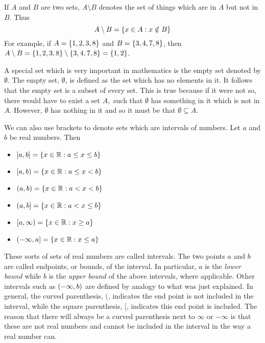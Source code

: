 If $A$ and $B$ are two sets, $A\setminus B$\index{$\setminus$} denotes the set of things which
are in $A$ but not in $B.$ Thus
\begin{equation*}
A\setminus B =  \left\{x\in A:x\notin B\right\} 
\end{equation*}
For example, if $A = \left\{1,2,3,8 \right\}$ and $B = \left\{3,4,7,8 \right\}$, then $A \setminus B = \left\{1,2,3,8\right\} \setminus 
\left\{3,4,7,8 \right\} =\left\{1,2 \right\}$.

A special set which is very important in mathematics is the empty set denoted by $\emptyset .$ The empty set, $\emptyset $, is
defined as the set which has no elements in it. It follows that the empty set is a subset of every set. 
This is true because if it were not so, there would have to exist a set $A,$ such that $\emptyset $
has something in it which is not in $A.$ However, $\emptyset $ has nothing
in it and so it must be that $\emptyset \subseteq A.$

We can also use brackets to denote sets which are intervals of numbers. Let $a$ and $b$ be real numbers. Then

\begin{itemize}
\item $\left[a,b\right] = \left\{x \in \mathbb{R}: a\leq x\leq b\right\}$
\item $\left[a,b\right) = \left\{x \in \mathbb{R}: a\leq x<b\right\}$ 
\item $\left(a,b\right) = \left\{x \in \mathbb{R}: a<x<b\right\}$ 
\item $\left(a,b\right] = \left\{x \in \mathbb{R}: a<x\leq b\right\}$
\item $\left[a,\infty\right) = \left\{x \in \mathbb{R}: x\geq a\right\}$ 
\item $\left(-\infty,a\right] = \left\{x \in \mathbb{R}: x \leq a\right\}$ 
\end{itemize}

These sorts of sets of real
numbers are called intervals. The two points $a$ and $b$ are called
endpoints, or bounds, of the interval. In particular, $a$ is the {\em lower bound \em}  while $b$ is the {\em upper bound \em} of the above
intervals, where applicable. Other intervals such as $\left(-\infty ,b\right) $
are defined by analogy to what was just explained.
 In general, the curved
parenthesis, $($, indicates the end point is not included in the interval, while
the square parenthesis, $[$, indicates this end point is included. The reason that
there will always be a curved parenthesis next to $\infty $ or $-\infty $ is
that these are not real numbers and cannot be included in the interval in the way a real number can. 

